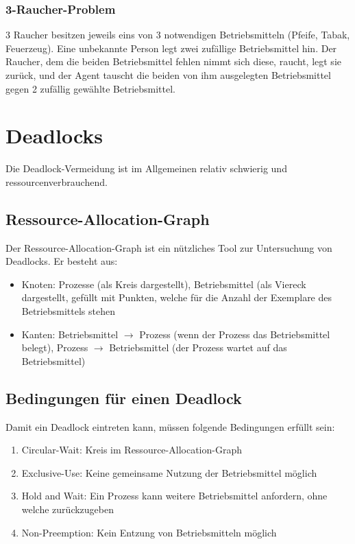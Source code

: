 \documentclass[11pt]{scrartcl}
\begin{document}
\subsubsection{3-Raucher-Problem}
3 Raucher besitzen jeweils eins von 3 notwendigen Betriebsmitteln (Pfeife, Tabak, Feuerzeug). Eine unbekannte Person legt zwei zufällige Betriebsmittel hin. Der Raucher, dem die beiden Betriebsmittel fehlen nimmt sich diese, raucht, legt sie zurück, und der Agent tauscht die beiden von ihm ausgelegten Betriebsmittel gegen 2 zufällig gewählte Betriebsmittel.

\section{Deadlocks}
Die Deadlock-Vermeidung ist im Allgemeinen relativ schwierig und ressourcenverbrauchend.

\subsection{Ressource-Allocation-Graph}
Der Ressource-Allocation-Graph ist ein nützliches Tool zur Untersuchung von Deadlocks. Er besteht aus:

\begin{itemize}
  \item{Knoten: Prozesse (als Kreis dargestellt), Betriebsmittel (als Viereck dargestellt, gefüllt mit Punkten, welche für die Anzahl der Exemplare des Betriebsmittels stehen}
  \item{Kanten: Betriebsmittel $\rightarrow$ Prozess (wenn der Prozess das Betriebsmittel belegt), Prozess $\rightarrow$ Betriebsmittel (der Prozess wartet auf das Betriebsmittel)}
\end{itemize}

\subsection{Bedingungen für einen Deadlock}
Damit ein Deadlock eintreten kann, müssen folgende Bedingungen erfüllt sein:

\begin{enumerate}
  \item{Circular-Wait: Kreis im Ressource-Allocation-Graph}
  \item{Exclusive-Use: Keine gemeinsame Nutzung der Betriebsmittel möglich}
  \item{Hold and Wait: Ein Prozess kann weitere Betriebsmittel anfordern, ohne welche zurückzugeben}
  \item{Non-Preemption: Kein Entzung von Betriebsmitteln möglich}
\end{enumerate}
\end{document}
